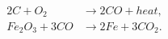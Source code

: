 \begin{equation}
\label{eq:co2}
\begin{aligned}
	2C + O_2 & \rightarrow 2CO + heat, \\
	Fe_2O_3 + 3CO & \rightarrow 2Fe + 3CO_2 .
\end{aligned}
\end{equation}
